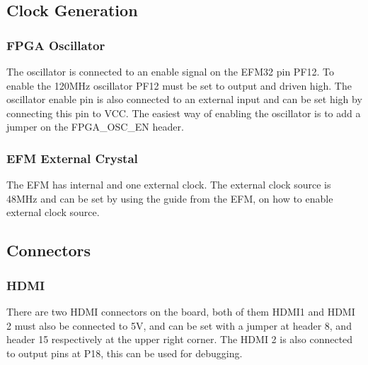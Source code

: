 \subsection{Clock Generation}
\subsubsection{FPGA Oscillator}The oscillator is connected to an enable signal on the EFM32 pin PF12. To enable the 120MHz oscillator PF12 must be set to output and driven high. The oscillator enable pin is also connected to an external input and can be set high by connecting this pin to VCC. The easiest way of enabling the oscillator is to add a jumper on the FPGA\_OSC\_EN header.

\subsubsection{EFM External Crystal}
The EFM has internal and one external clock. The external clock source is 48MHz and can be set by using the guide from the EFM, on how to enable external clock source. 
\subsection{Connectors}
\subsubsection{HDMI}
There are two HDMI connectors on the board, both of them HDMI1 and HDMI 2 must also be connected to 5V, and can be set with a jumper at header 8, and header 15 respectively at the upper right corner. The HDMI 2 is also connected to output pins at P18, this can be used for debugging.

